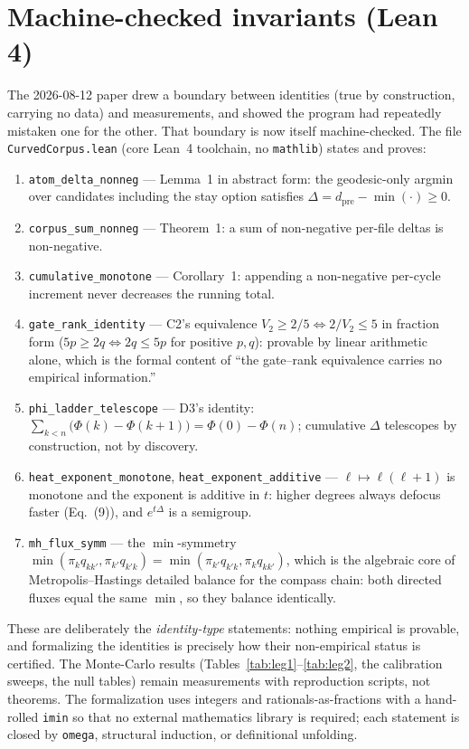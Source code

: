\documentclass[11pt,a4paper]{article}
\theoremstyle{plain}
\theoremstyle{remark}
\begin{document}
\section{Machine-checked invariants (Lean 4)}
\label{sec:lean}

The 2026-08-12 paper drew a boundary between identities (true by construction, carrying no data) and measurements, and showed the program had repeatedly mistaken one for the other. That boundary is now itself machine-checked. The file \texttt{CurvedCorpus.lean} (core Lean~4 toolchain, no \texttt{mathlib}) states and proves:

\begin{enumerate}
\item \texttt{atom\_delta\_nonneg} --- Lemma~1 in abstract form: the geodesic-only argmin over candidates including the stay option satisfies $\Delta=d_{\mathrm{pre}}-\min(\cdot)\ge0$.
\item \texttt{corpus\_sum\_nonneg} --- Theorem~1: a sum of non-negative per-file deltas is non-negative.
\item \texttt{cumulative\_monotone} --- Corollary~1: appending a non-negative per-cycle increment never decreases the running total.
\item \texttt{gate\_rank\_identity} --- C2's equivalence $V_2\ge2/5\iff2/V_2\le5$ in fraction form ($5p\ge2q\iff2q\le5p$ for positive $p,q$): provable by linear arithmetic alone, which is the formal content of ``the gate--rank equivalence carries no empirical information.''
\item \texttt{phi\_ladder\_telescope} --- D3's identity: $\sum_{k<n}\big(\Phi(k)-\Phi(k{+}1)\big)=\Phi(0)-\Phi(n)$; cumulative $\Delta$ telescopes by construction, not by discovery.
\item \texttt{heat\_exponent\_monotone}, \texttt{heat\_exponent\_additive} --- $\ell\mapsto\ell(\ell+1)$ is monotone and the exponent is additive in $t$: higher degrees always defocus faster (Eq.~(9)), and $e^{t\Delta}$ is a semigroup.
\item \texttt{mh\_flux\_symm} --- the $\min$-symmetry $\min(\pi_kq_{kk'},\pi_{k'}q_{k'k})=\min(\pi_{k'}q_{k'k},\pi_kq_{kk'})$, which is the algebraic core of Metropolis--Hastings detailed balance for the compass chain: both directed fluxes equal the same $\min$, so they balance identically.
\end{enumerate}

These are deliberately the \emph{identity-type} statements: nothing empirical is provable, and formalizing the identities is precisely how their non-empirical status is certified. The Monte-Carlo results (Tables~\ref{tab:leg1}--\ref{tab:leg2}, the calibration sweeps, the null tables) remain measurements with reproduction scripts, not theorems. The formalization uses integers and rationals-as-fractions with a hand-rolled \texttt{imin} so that no external mathematics library is required; each statement is closed by \texttt{omega}, structural induction, or definitional unfolding.
\end{document}
